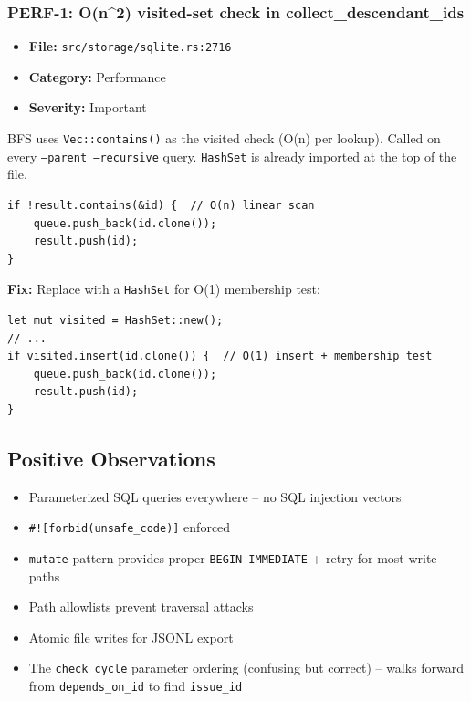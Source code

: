 \documentclass[twocolumn,10pt,letterpaper]{article}
\begin{document}
\subsubsection{PERF-1: O(n\^{}2) visited-set check in collect\_descendant\_ids}

\begin{itemize}
\setlength{\itemsep}{0pt}
\setlength{\parskip}{0pt}
  \item \textbf{File:} \texttt{src/storage/sqlite.rs:2716}
  \item \textbf{Category:} Performance
  \item \textbf{Severity:} Important
\end{itemize}

BFS uses \texttt{Vec::contains()} as the visited check (O(n) per lookup). Called on every \texttt{--parent --recursive} query. \texttt{HashSet} is already imported at the top of the file.


\begin{lstlisting}
if !result.contains(&id) {  // O(n) linear scan
    queue.push_back(id.clone());
    result.push(id);
}
\end{lstlisting}

\textbf{Fix:} Replace with a \texttt{HashSet} for O(1) membership test:


\begin{lstlisting}
let mut visited = HashSet::new();
// ...
if visited.insert(id.clone()) {  // O(1) insert + membership test
    queue.push_back(id.clone());
    result.push(id);
}
\end{lstlisting}

\subsection{Positive Observations}

\begin{itemize}
\setlength{\itemsep}{0pt}
\setlength{\parskip}{0pt}
  \item Parameterized SQL queries everywhere -- no SQL injection vectors
  \item \texttt{#![forbid(unsafe\_code)]} enforced
  \item \texttt{mutate} pattern provides proper \texttt{BEGIN IMMEDIATE} + retry for most write paths
  \item Path allowlists prevent traversal attacks
  \item Atomic file writes for JSONL export
  \item The \texttt{check\_cycle} parameter ordering (confusing but correct) -- walks forward from \texttt{depends\_on\_id} to find \texttt{issue\_id}
\end{itemize}


\balance
\end{document}
